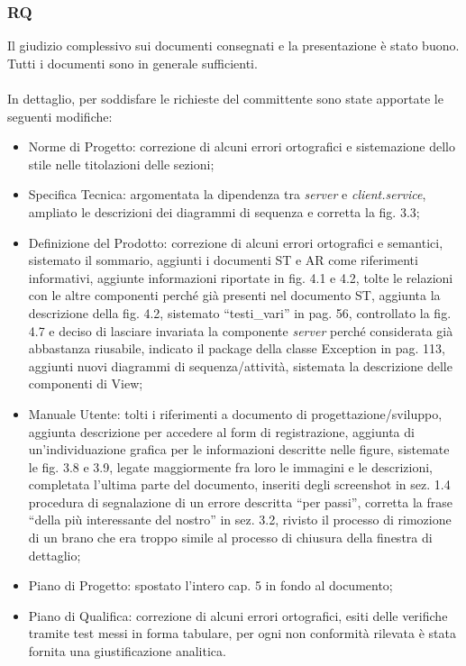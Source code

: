 \subsubsection*{RQ}
Il giudizio complessivo sui documenti consegnati e la presentazione \`e stato
buono. Tutti i documenti sono in generale sufficienti.  \\ \\ In dettaglio, per
soddisfare le richieste del committente sono state apportate le seguenti modifiche:
\begin{itemize}
  \item Norme di Progetto: correzione di alcuni errori ortografici e
  sistemazione dello stile nelle titolazioni delle sezioni;
  \item Specifica Tecnica: argomentata la dipendenza tra \emph{server} e
  \emph{client.service}, ampliato le descrizioni dei diagrammi di sequenza e
  corretta la fig. 3.3;
  \item Definizione del Prodotto: correzione di alcuni errori
  ortografici e semantici, sistemato il sommario, aggiunti i documenti ST e AR
  come riferimenti informativi, aggiunte informazioni riportate in fig. 4.1 e
  4.2, tolte le relazioni con le altre componenti perch\'e gi\`a presenti nel
  documento ST, aggiunta la descrizione della fig. 4.2, sistemato
  ``testi\_vari'' in pag. 56, controllato la fig. 4.7 e deciso di
  lasciare invariata la componente \emph{server} perch\'e considerata gi\`a
  abbastanza riusabile, indicato il package della classe Exception
  in pag. 113, aggiunti nuovi diagrammi di sequenza/attivit\`a, sistemata la
  descrizione delle componenti di View;
  \item Manuale Utente: tolti i riferimenti a documento di
  progettazione/sviluppo, aggiunta descrizione per accedere al form di
  registrazione, aggiunta di un'individuazione grafica per le informazioni
  descritte nelle figure, sistemate le fig. 3.8 e 3.9, legate maggiormente fra
  loro le immagini e le descrizioni, completata l'ultima parte del documento,
  inseriti degli screenshot in sez. 1.4 procedura di segnalazione di
  un errore descritta ``per passi'', corretta la frase ``della
  pi\`u interessante del nostro'' in sez. 3.2, rivisto il processo di
  rimozione di un brano che era troppo simile al processo di chiusura della
  finestra di dettaglio;
  \item Piano di Progetto: spostato l'intero cap. 5 in fondo al documento;
  \item Piano di Qualifica: correzione di alcuni errori ortografici, esiti delle
  verifiche tramite test messi in forma tabulare, per ogni non conformit\`a
  rilevata \`e stata fornita una giustificazione analitica.
\end{itemize}

